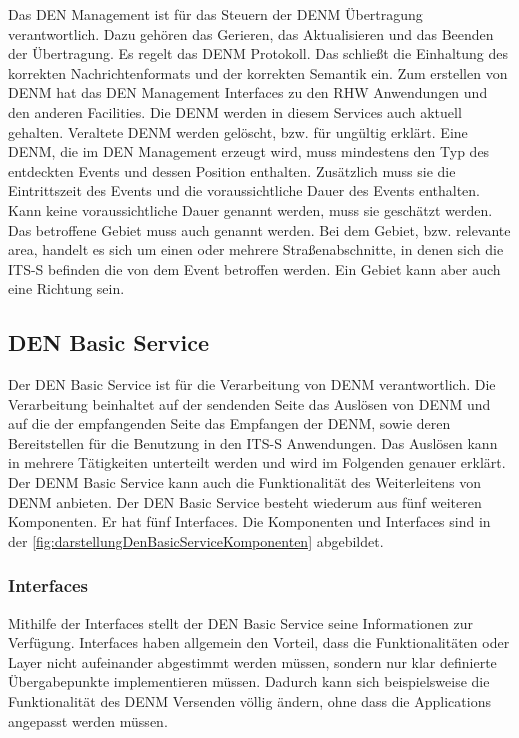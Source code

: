 Das \ac{DEN} Management  ist für das Steuern der \ac{DENM} Übertragung verantwortlich. Dazu gehören das Gerieren, das Aktualisieren und das Beenden der Übertragung. Es regelt das \ac{DENM} Protokoll. Das schließt die Einhaltung des korrekten Nachrichtenformats und der korrekten Semantik ein. Zum erstellen von \ac{DENM} hat das \ac{DEN} Management Interfaces zu den \ac{RHW} Anwendungen und den anderen Facilities. Die \ac{DENM} werden in diesem Services auch aktuell gehalten. Veraltete \ac{DENM} werden gelöscht, bzw. für ungültig erklärt. Eine \ac{DENM}, die im \ac{DEN} Management erzeugt wird, muss mindestens den Typ des entdeckten Events und dessen Position enthalten. Zusätzlich muss sie die Eintrittszeit des Events und die voraussichtliche Dauer des Events enthalten. Kann keine voraussichtliche Dauer genannt werden, muss sie geschätzt werden. Das betroffene Gebiet muss auch genannt werden. Bei dem Gebiet, bzw. relevante area, handelt es sich um einen oder mehrere Straßenabschnitte, in denen sich die \ac{ITS-S} befinden die von dem Event betroffen werden. Ein Gebiet kann aber auch eine Richtung sein.

\subsection{DEN Basic Service}
Der \ac{DEN} Basic Service ist für die Verarbeitung von \ac{DENM} verantwortlich. Die Verarbeitung beinhaltet auf der sendenden Seite das Auslösen von \ac{DENM} und auf die der empfangenden Seite das Empfangen der \ac{DENM}, sowie deren Bereitstellen für die Benutzung in den \ac{ITS-S} Anwendungen. Das Auslösen kann in mehrere Tätigkeiten unterteilt werden und wird im Folgenden genauer erklärt. Der \ac{DENM} Basic Service kann auch die Funktionalität des Weiterleitens von \ac{DENM} anbieten. Der \ac{DEN} Basic Service besteht wiederum aus fünf weiteren Komponenten. Er hat fünf Interfaces. Die Komponenten und Interfaces sind in der \autoref{fig:darstellungDenBasicServiceKomponenten} abgebildet.

\subsubsection{Interfaces}
Mithilfe der Interfaces stellt der \ac{DEN} Basic Service seine Informationen zur Verfügung. Interfaces haben allgemein den Vorteil, dass die Funktionalitäten oder Layer nicht aufeinander abgestimmt werden müssen, sondern nur klar definierte Übergabepunkte implementieren müssen. Dadurch kann sich beispielsweise die Funktionalität des \ac{DENM} Versenden völlig ändern, ohne dass die Applications angepasst werden müssen. 

